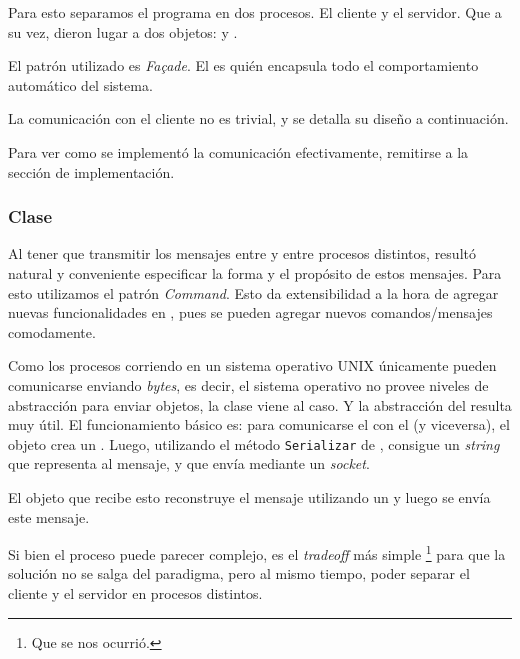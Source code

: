           Para esto separamos el programa en dos procesos. El cliente y el servidor.
          Que a su vez, dieron lugar a dos objetos: \cliente{} y \servidor{}.

          El patr\'on utilizado es \textit{Fa\c{c}ade}. El \servidor{} es qui\'en
          encapsula todo el comportamiento autom\'atico del sistema.

          La comunicaci\'on con el cliente no es trivial, y se detalla su dise\~no a
          continuaci\'on.

          Para ver como se implement\'o la comunicaci\'on efectivamente, remitirse
          a la secci\'on de implementaci\'on.
          
      \subsubsection{Clase \mensaje{}}
          Al tener que transmitir los mensajes entre \cliente{} y \servidor{} entre
          procesos distintos, result\'o natural y conveniente especificar la forma
          y el prop\'osito de estos mensajes.
          Para esto utilizamos el patr\'on \textit{Command}. Esto da extensibilidad
          a la hora de agregar nuevas funcionalidades en \servidor{}, pues se pueden
          agregar nuevos comandos/mensajes comodamente.

          Como los procesos corriendo en un sistema operativo \textsc{UNIX} \'unicamente
          pueden comunicarse enviando \textit{bytes}, es decir, el sistema operativo no
          provee niveles de abstracci\'on para enviar objetos, la clase
          \constructorMensaje{} viene al caso. Y la abstracci\'on del \mensaje{}
          resulta muy \'util.
          El funcionamiento b\'asico es: para comunicarse el \cliente{} con el \servidor{}
          (y viceversa), el objeto crea un \mensaje{}.
          Luego, utilizando el m\'etodo \texttt{Serializar} de \mensaje{}, consigue un
          \textit{string} que representa al mensaje, y que env\'ia mediante un \textit{socket}.

          El objeto que recibe esto reconstruye el mensaje utilizando un \constructorMensaje{}
          y luego se env\'ia este mensaje.

          Si bien el proceso puede parecer complejo, es el \textit{tradeoff} m\'as simple
          \footnote{Que se nos ocurri\'o.} para que la soluci\'on no se salga del paradigma,
          pero al mismo tiempo, poder separar el cliente y el servidor en procesos distintos.

